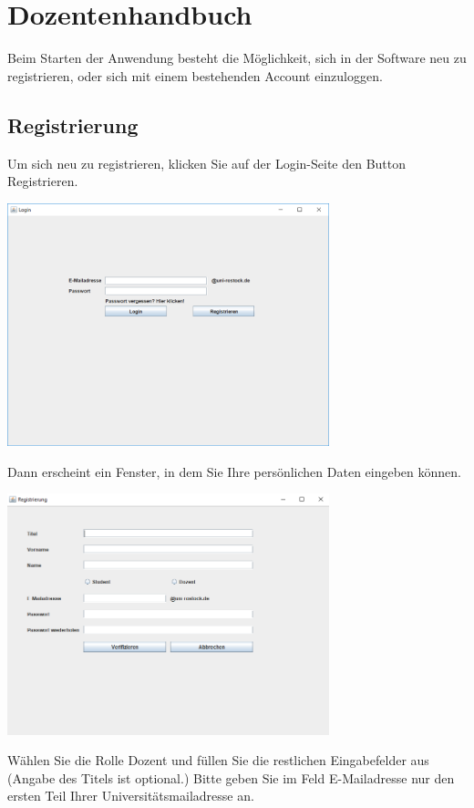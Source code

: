 \documentclass{Handbuch}
\begin{document}
\newpage
\section{Dozentenhandbuch}
Beim Starten der Anwendung besteht die Möglichkeit, sich in der Software neu zu registrieren, oder sich mit einem bestehenden Account einzuloggen.

\subsection{Registrierung}
Um sich neu zu registrieren, klicken Sie auf der Login-Seite den Button \frqq Registrieren\flqq{}. 
\begin{center}
	\includegraphics[width=0.7\textwidth]{img_DozentenGUI_01.png}
\end{center}
Dann erscheint ein Fenster, in dem Sie Ihre persönlichen Daten eingeben können. 
\begin{center}
	\includegraphics[width=0.7\textwidth]{img_DozentenGUI_02.png}
\end{center}
Wählen Sie die Rolle \glqq Dozent\grqq{} und füllen Sie die restlichen Eingabefelder aus (Angabe des Titels ist optional.) Bitte geben Sie im Feld \glqq E-Mailadresse\grqq{} nur den ersten Teil Ihrer Universitätsmailadresse an.
\end{document}
